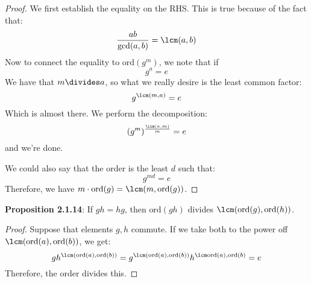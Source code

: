 \documentclass{report}
\begin{document}
\begin{proof}
    We first establish the equality on the RHS. This is true because of the fact that:
        \begin{equation*}
            \dfrac{ab}{\gcd(a, b)} = \lcm(a, b)
        \end{equation*}
    Now to connect the equality to $\text{ord}(g^{m})$, we note that if
        \begin{equation*}
            g^{a} = e
        \end{equation*}
    We have that $m \divides a$, so what we really desire is the least common factor:
        \begin{equation*}
            g^{\lcm(m, a)} = e
        \end{equation*}
    Which is almost there. We perform the decomposition:
        \begin{equation*}
            (g^{m})^{\frac{\lcm(a, m)}{m}} = e
        \end{equation*}
    and we're done.

    We could also say that the order is the least $d$ such that:
        \begin{equation*}
            g^{md} = e
        \end{equation*}
    Therefore, we have $m \cdot \text{ord}(g) = \lcm(m, \text{ord}(g))$.
\end{proof}

\textbf{Proposition 2.1.14}: If $gh = hg$, then $\text{ord}(gh)$ divides $\lcm(\text{ord}(g), \text{ord}(h))$.
    \begin{proof}
        Suppose that elements $g, h$ commute. If we take both to the power off $\lcm(\text{ord}(a), \text{ord}(b))$, we get:
            \begin{equation*}
                gh^{\lcm(\text{ord}(a), \text{ord}(b))} = g^{\lcm(\text{ord}(a), \text{ord}(b))}h^{\lcm\text{ord}(a), \text{ord}(b)} = e
            \end{equation*}
        Therefore, the order divides this.
    \end{proof}
\end{document}
